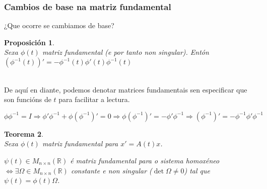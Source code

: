 \documentclass[11pt, a4paper,twoside]{article}
\makeatletter
\theoremstyle{theorem-style}  %
\newtheorem{theorem}{Teorema}[section]  %
\newtheorem{proposition}[theorem]{Proposición}
\renewenvironment{proof}[1][\proofname]{\par
	\pushQED{\qed}%
	\normalfont \topsep6\p@\@plus6\p@\relax
	\list{}{%
		\settowidth{\leftmargin}{\quad:\hskip\labelsep}%
		\setlength{\labelwidth}{0pt}%
		\setlength{\itemindent}{-\leftmargin}%
	}%
	\item[\hskip\labelsep\itshape#1\@addpunct{:}]\ignorespaces
}{%
	\popQED\endlist\@endpefalse
}
\theoremstyle{definition-style}
\theoremstyle{example-style}
\makeatother
\begin{document}
\subsubsection{Cambios de base na matriz fundamental}
¿Que ocorre se cambiamos de base?
\begin{proposition}\label{derivinversa}\ \\
	Sexa $ \phi(t) $ matriz fundamental (e por tanto non singular). Entón $ (\phi^{-1}(t))'=-\phi^{-1}(t)\phi'(t)\phi^{-1}(t) $
\end{proposition}
\begin{proof}\ \\
	De aquí en diante, podemos denotar matrices fundamentais sen especificar que son funcións de $ t $ para facilitar a lectura.
	
	\[ \phi \phi^{-1}=I\Rightarrow \phi'\phi^{-1}+\phi (\phi^{-1})'=0\Rightarrow \phi (\phi^{-1})'=-\phi'\phi^{-1} \Rightarrow (\phi^{-1})'=-\phi^{-1}\phi'\phi^{-1}\]
\end{proof}
\begin{theorem}\ \\
	Sexa $ \phi(t) $ matriz fundamental para $ x'=A(t)x $.
	
	$ \psi(t) \in M_{n\times n}(\mathbb{R})$ é matriz fundamental para o sistema homoxéneo $ \Leftrightarrow \exists \varOmega \in M_{n\times n}(\mathbb{R})$ constante e non singular ($ \det \varOmega \neq 0 $) tal que $ \psi(t) = \phi(t)\varOmega $.
\end{theorem}
\end{document}
